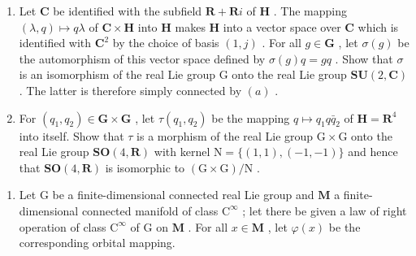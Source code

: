 \begin{enumerate}
\def\labelenumi{(\alph{enumi})}
\setcounter{enumi}{2}
\item
  Let \(\mathbf{C}\) be identified with the subfield \(\mathbf{R} + \mathbf{R}i\) of \(\mathbf{H}\) . The mapping \((\lambda, q) \mapsto q\lambda\) of \(\mathbf{C} \times \mathbf{H}\) into \(\mathbf{H}\) makes \(\mathbf{H}\) into a vector space over \(\mathbf{C}\) which is identified with \(\mathbf{C}^2\) by the choice of basis \((1, j)\) . For all \(g \in \mathbf{G}\) , let \(\sigma(g)\) be the automorphism of this vector space defined by \(\sigma(g)q = gq\) . Show that \(\sigma\) is an isomorphism of the real Lie group G onto the real Lie group \(\mathbf{SU}(2, \mathbf{C})\) . The latter is therefore simply connected by \((a)\) .
\item
  For \((q_{1}, q_{2}) \in \mathbf{G} \times \mathbf{G}\) , let \(\tau(q_{1}, q_{2})\) be the mapping \(q \mapsto q_{1}q\bar{q}_{2}\) of \(\mathbf{H} = \mathbf{R}^{4}\) into itself. Show that \(\tau\) is a morphism of the real Lie group \(\mathrm{G} \times \mathrm{G}\) onto the real Lie group \(\mathbf{SO}(4, \mathbf{R})\) with kernel \(\mathrm{N} = \{(1, 1), (-1, -1)\}\) and hence that \(\mathbf{SO}(4, \mathbf{R})\) is isomorphic to \((\mathrm{G} \times \mathrm{G}) / \mathrm{N}\) .
\end{enumerate}

\begin{enumerate}
\def\labelenumi{\arabic{enumi}.}
\setcounter{enumi}{7}
\tightlist
\item
  Let \(\mathrm{G}\) be a finite-dimensional connected real Lie group and \(\mathbf{M}\) a finite-dimensional connected manifold of class \(\mathrm{C}^{\infty}\) ; let there be given a law of right operation of class \(\mathrm{C}^{\infty}\) of \(\mathrm{G}\) on \(\mathbf{M}\) . For all \(x \in \mathbf{M}\) , let \(\varphi(x)\) be the corresponding orbital mapping.
\end{enumerate}

